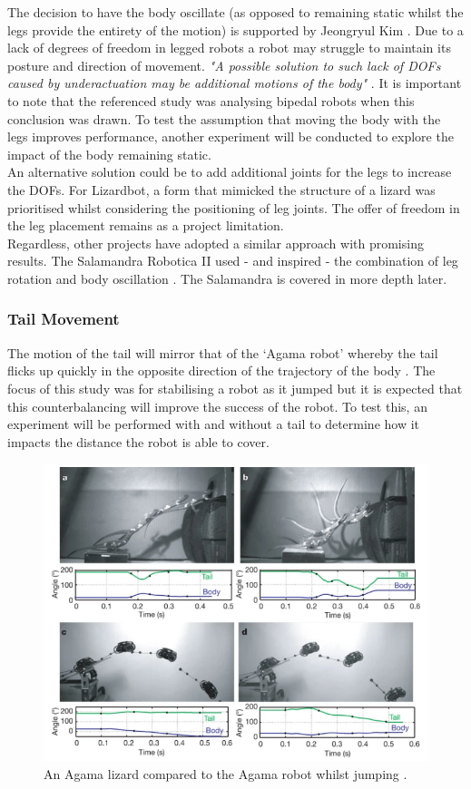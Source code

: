 \documentclass{article}
\begin{document}
The decision to have the body oscillate (as opposed to remaining static whilst the legs provide the entirety of the motion) is supported by Jeongryul Kim . Due to a lack of degrees of freedom in legged robots a robot may struggle to maintain its posture and direction of movement. \textit{"A possible solution to such lack of DOFs caused by underactuation may be additional motions of the body"} .
It is important to note that the referenced study was analysing bipedal robots when this conclusion was drawn. To test the assumption that moving the body with the legs improves performance, another experiment will be conducted to explore the impact of the body remaining static. \\
An alternative solution could be to add additional joints for the legs to increase the DOFs. For Lizardbot, a form that mimicked the structure of a lizard was prioritised whilst considering the positioning of leg joints. The offer of freedom in the leg placement remains as a project limitation. \\
Regardless, other projects have adopted a similar approach with promising results. The Salamandra Robotica II used - and inspired - the combination of leg rotation and body oscillation . The Salamandra is covered in more depth later.

\newpage
\subsubsection{Tail Movement}
\label{sec:Tail Movement}
The motion of the tail will mirror that of the ‘Agama robot’ whereby the tail flicks up quickly in the opposite direction of the trajectory of the body . The focus of this study was for stabilising a robot as it jumped but it is expected that this counterbalancing  will improve the success of the robot. To test this, an experiment will be performed with and without a tail to determine how it impacts the distance the robot is able to cover. 
\begin{figure}[H]
\centering
\includegraphics[scale=0.6]{agamaJump}
\caption{An Agama lizard compared to the Agama robot whilst jumping \citep{agama}.}
\end{figure}
\end{document}
